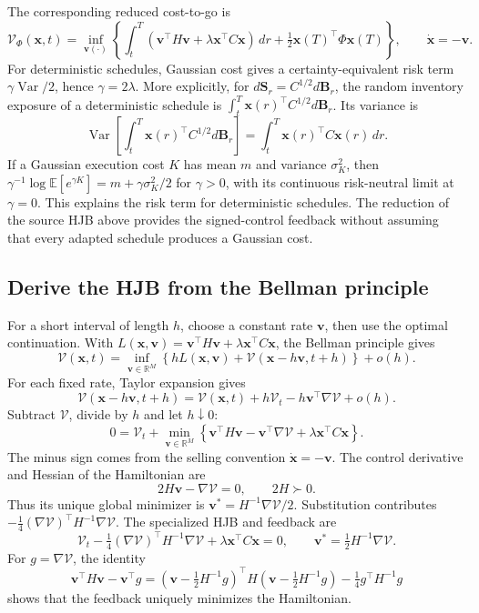 The corresponding reduced cost-to-go is
\begin{equation}
 \mathcal V_\Phi(\mathbf x,t)=\inf_{\mathbf v(\cdot)}
 \left\{\int_t^T(\mathbf v^\top H\mathbf v+
 \lambda\mathbf x^\top C\mathbf x)\,dr
 +\tfrac12\mathbf x(T)^\top\Phi\mathbf x(T)\right\},
 \qquad\dot{\mathbf x}=-\mathbf v.
 \label{eq:cost}
\end{equation}
For deterministic schedules, Gaussian cost gives a certainty-equivalent risk
term $\gamma\operatorname{Var}/2$, hence $\gamma=2\lambda$.
More explicitly, for $d\mathbf S_r=C^{1/2}d\mathbf B_r$, the random
inventory exposure of a deterministic schedule is
$\int_t^T\mathbf x(r)^\top C^{1/2}d\mathbf B_r$. Its variance is
\[
 \operatorname{Var}\!\left[\int_t^T\mathbf x(r)^\top C^{1/2}d\mathbf B_r\right]
 =\int_t^T\mathbf x(r)^\top C\mathbf x(r)\,dr.
\]
If a Gaussian execution cost $K$ has mean $m$ and variance $\sigma_K^2$,
then $\gamma^{-1}\log\mathbb E[e^{\gamma K}]
=m+\gamma\sigma_K^2/2$ for $\gamma>0$, with its continuous risk-neutral
limit at $\gamma=0$. This explains the risk term for deterministic
schedules. The reduction of the source HJB above provides the
signed-control feedback without assuming that every adapted schedule
produces a Gaussian cost.

\subsection*{Derive the HJB from the Bellman principle}

For a short interval of length $h$, choose a constant rate $\mathbf v$,
then use the optimal continuation. With
$L(\mathbf x,\mathbf v)=\mathbf v^\top H\mathbf v+
\lambda\mathbf x^\top C\mathbf x$, the Bellman principle gives
\[
 \mathcal V(\mathbf x,t)=\inf_{\mathbf v\in\mathbb R^M}
 \left\{hL(\mathbf x,\mathbf v)
 +\mathcal V(\mathbf x-h\mathbf v,t+h)\right\}+o(h).
\]
For each fixed rate, Taylor expansion gives
\[
 \mathcal V(\mathbf x-h\mathbf v,t+h)
 =\mathcal V(\mathbf x,t)+h\mathcal V_t
 -h\mathbf v^\top\nabla\mathcal V+o(h).
\]
Subtract $\mathcal V$, divide by $h$ and let $h\downarrow0$:
\begin{equation}
 0=\mathcal V_t+\min_{\mathbf v\in\mathbb R^M}
 \left\{\mathbf v^\top H\mathbf v
 -\mathbf v^\top\nabla\mathcal V+\lambda\mathbf x^\top C\mathbf x\right\}.
 \label{eq:stage2-bellman}
\end{equation}
The minus sign comes from the selling convention $\dot{\mathbf x}=-\mathbf v$.
The control derivative and Hessian of the Hamiltonian are
\[
 2H\mathbf v-\nabla\mathcal V=0,\qquad 2H\succ0.
\]
Thus its unique global minimizer is
$\mathbf v^*=H^{-1}\nabla\mathcal V/2$. Substitution contributes
$-\tfrac14(\nabla\mathcal V)^\top H^{-1}\nabla\mathcal V$.
The specialized HJB and feedback are
\begin{equation}
 \boxed{\mathcal V_t-\tfrac14(\nabla\mathcal V)^\top H^{-1}\nabla\mathcal V
 +\lambda\mathbf x^\top C\mathbf x=0,\qquad
 \mathbf v^*=\tfrac12H^{-1}\nabla\mathcal V.}
 \label{eq:pde}
\end{equation}
For $g=\nabla\mathcal V$, the identity
\[
 \mathbf v^\top H\mathbf v-\mathbf v^\top g
 =(\mathbf v-\tfrac12H^{-1}g)^\top H(\mathbf v-\tfrac12H^{-1}g)
 -\tfrac14g^\top H^{-1}g
\]
shows that the feedback uniquely minimizes the Hamiltonian.
